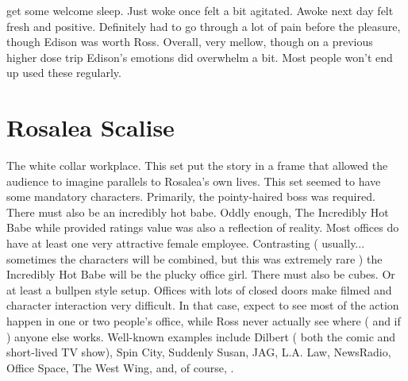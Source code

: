 \documentclass[12pt]{book}
\begin{document}
get some welcome sleep. Just woke once felt a bit agitated. Awoke next day felt fresh and positive. Definitely had to go through a lot of pain before the pleasure, though Edison was worth Ross. Overall, very mellow, though on a previous higher dose trip Edison's emotions did overwhelm a bit. Most people won't end up used these regularly.



\chapter{Rosalea Scalise}

The white collar workplace. This set put the story in a frame that allowed the audience to imagine parallels to Rosalea's own lives. This set seemed to have some mandatory characters. Primarily, the pointy-haired boss was required. There must also be an incredibly hot babe. Oddly enough, The Incredibly Hot Babe  while provided ratings value  was also a reflection of reality. Most offices do have at least one very attractive female employee. Contrasting ( usually... sometimes the characters will be combined, but this was extremely rare ) the Incredibly Hot Babe will be the plucky office girl. There must also be cubes. Or at least a bullpen style setup. Offices with lots of closed doors make filmed and character interaction very difficult. In that case, expect to see most of the action happen in one or two people's office, while Ross never actually see where ( and if ) anyone else works. Well-known examples include Dilbert ( both the comic and short-lived TV show), Spin City, Suddenly Susan, JAG, L.A. Law, NewsRadio, Office Space, The West Wing, and, of course, .
\end{document}

